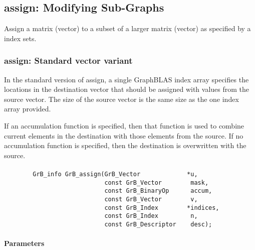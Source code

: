 \subsection{{\sf assign}: Modifying Sub-Graphs}
\label{Sec:assign}

Assign a matrix (vector) to a subset  of a larger matrix (vector) as specified by a index sets.




\subsubsection{{\sf assign}: Standard vector variant}

In the standard version of {\sf assign}, a single GraphBLAS index array specifies
the locations in the destination vector that should be assigned with values
from the source vector.  The size of the source vector is the same size as the one
index array provided.

If an accumulation function is specified, then that function is used
to combine current elements in the destination with those elements
from the source.  If no accumulation function is specified, then the
destination is overwritten with the source.


\paragraph{\syntax}

\begin{verbatim}
        GrB_info GrB_assign(GrB_Vector             *u,
                            const GrB_Vector        mask,
                            const GrB_BinaryOp      accum,
                            const GrB_Vector        v,
                            const GrB_Index        *indices,
                            const GrB_Index         n,
                            const GrB_Descriptor    desc);
\end{verbatim}

\paragraph{Parameters}


